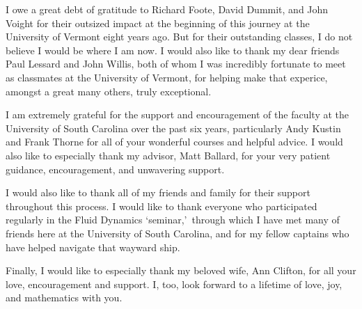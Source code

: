 I owe a great debt of gratitude to Richard Foote, David Dummit, and John Voight for their outsized impact at the beginning of this journey at the University of Vermont eight years ago.
But for their outstanding classes, I do not believe I would be where I am now.
I would also like to thank my dear friends Paul Lessard and John Willis, both of whom I was incredibly fortunate to meet as classmates at the University of Vermont, for helping make that experice, amongst a great many others, truly exceptional.

I am extremely grateful for the support and encouragement of the faculty at the University of South Carolina over the past six years, particularly Andy Kustin and Frank Thorne for all of your wonderful courses and helpful advice.
I would also like to especially thank my advisor, Matt Ballard, for your very patient guidance, encouragement, and unwavering support.

I would also like to thank all of my friends and family for their support throughout this process.
I would like to thank everyone who participated regularly in the Fluid Dynamics \lq seminar,\rq\, through which I have met many of friends here at the University of South Carolina, and for my fellow captains who have helped navigate that wayward ship.

Finally, I would like to especially thank my beloved wife, Ann Clifton, for all your love, encouragement and support.
I, too, look forward to a lifetime of love, joy, and mathematics with you.

